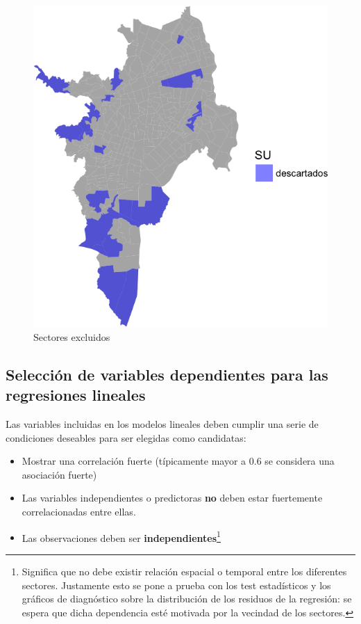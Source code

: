 \documentclass[12pt,a4paper,openany]{book}
\providecommand{\tightlist}{%
  \setlength{\itemsep}{0pt}\setlength{\parskip}{0pt}}
\let\rmarkdownfootnote\footnote%
\def\footnote{\protect\rmarkdownfootnote}
\theoremstyle{definition}
\theoremstyle{definition}
\theoremstyle{definition}
\theoremstyle{remark}
\begin{document}
\begin{figure}

{\centering \includegraphics[width=1\linewidth]{tesis-unigis_files/figure-latex/mapa-excluidos-1} 

}

\caption{Sectores excluidos}\label{fig:mapa-excluidos}
\end{figure}

\subsection{Selección de variables dependientes para las regresiones
lineales}\label{seleccion-de-variables-dependientes-para-las-regresiones-lineales}

Las variables incluidas en los modelos lineales deben cumplir una serie
de condiciones deseables para ser elegidas como candidatas:

\begin{itemize}
\tightlist
\item
  Mostrar una correlación fuerte (típicamente mayor a 0.6 se considera
  una asociación fuerte)
\item
  Las variables independientes o predictoras \textbf{no} deben estar
  fuertemente correlacionadas entre ellas.
\item
  Las observaciones deben ser \textbf{independientes}\footnote{Significa
    que no debe existir relación espacial o temporal entre los
    diferentes sectores. Justamente esto se pone a prueba con los test
    estadísticos y los gráficos de diagnóstico sobre la distribución de
    los residuos de la regresión: se espera que dicha dependencia esté
    motivada por la vecindad de los sectores.}
\end{itemize}
\end{document}
